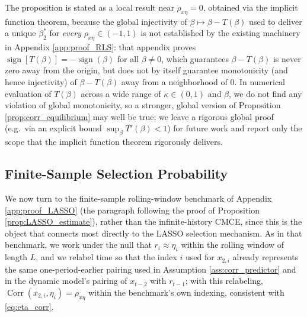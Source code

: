 \begin{remark}\label{rem:scope_corr}
The proposition is stated as a local result near $\rho_{x\eta}=0$, obtained via the implicit function theorem, because the global injectivity of $\beta\mapsto\beta-T(\beta)$ used to deliver a unique $\beta_2^*$ for \emph{every} $\rho_{x\eta}\in(-1,1)$ is not established by the existing machinery in Appendix \ref{app:proof_RLS}: that appendix proves $\operatorname{sign}[T(\beta)]=-\operatorname{sign}(\beta)$ for all $\beta\neq0$, which guarantees $\beta-T(\beta)$ is never zero away from the origin, but does not by itself guarantee monotonicity (and hence injectivity) of $\beta-T(\beta)$ away from a neighborhood of $0$. In numerical evaluation of $T(\beta)$ across a wide range of $\kappa\in(0,1)$ and $\beta$, we do not find any violation of global monotonicity, so a stronger, global version of Proposition \ref{prop:corr_equilibrium} may well be true; we leave a rigorous global proof (e.g.\ via an explicit bound $\sup_\beta T'(\beta)<1$) for future work and report only the scope that the implicit function theorem rigorously delivers.
\end{remark}

\subsection{Finite-Sample Selection Probability}

We now turn to the finite-sample rolling-window benchmark of Appendix \ref{app:proof_LASSO} (the paragraph following the proof of Proposition \ref{prop:LASSO_estimate}), rather than the infinite-history CMCE, since this is the object that connects most directly to the LASSO selection mechanism. As in that benchmark, we work under the null that $r_i\approx\eta_i$ within the rolling window of length $L$, and we relabel time so that the index $i$ used for $x_{2,i}$ already represents the same one-period-earlier pairing used in Assumption \ref{ass:corr_predictor} and in the dynamic model's pairing of $x_{t-2}$ with $r_{t-1}$; with this relabeling, $\operatorname{Corr}(x_{2,i},\eta_i)=\rho_{x\eta}$ within the benchmark's own indexing, consistent with \eqref{eq:eta_corr}.


